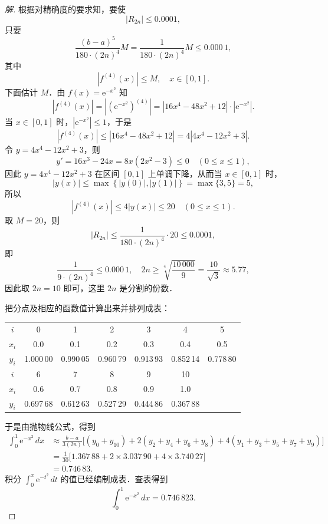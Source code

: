 \begin{proof}[解]
根据对精确度的要求知，要使
\[
|R_{2n}| \leqslant 0.0001,
\]
只要
\[
\frac{(b - a)^5}{180\cdot(2n)^4}M = \frac{1}{180\cdot(2n)^4}M \leqslant 0.000\,1,
\]
其中
\[
|f^{(4)}(x)| \leqslant M, \quad x \in [0,1].
\]
下面估计 $M$．由 $f(x) = \mathrm{e}^{-x^2}$ 知
\[
|f^{(4)}(x)| = \left|\left(\mathrm{e}^{-x^2}\right)^{(4)}\right| = |16x^4 - 48x^2 + 12|\cdot\left|\mathrm{e}^{-x^2}\right|.
\]
当 $x \in [0,1]$ 时，$\left|\mathrm{e}^{-x^2}\right| \leqslant 1$，于是
\[
|f^{(4)}(x)| \leqslant |16x^4 - 48x^2 + 12| = 4|4x^4 - 12x^2 + 3|.
\]
令 $y = 4x^4 - 12x^2 + 3$，则
\[
y' = 16x^3 - 24x = 8x(2x^2 - 3) \leqslant 0 \quad (0 \leqslant x \leqslant 1),
\]
因此 $y = 4x^4 - 12x^2 + 3$ 在区间 $[0,1]$ 上单调下降，从而当 $x \in [0,1]$ 时，
\[
|y(x)| \leqslant \max\left\{|y(0)|, |y(1)|\right\} = \max\{3, 5\} = 5,
\]
所以
\[
|f^{(4)}(x)| \leqslant 4|y(x)| \leqslant 20 \quad (0 \leqslant x \leqslant 1).
\]
取 $M = 20$，则
\[
|R_{2n}| \leqslant \frac{1}{180\cdot(2n)^4}\cdot 20 \leqslant 0.0001,
\]
即
\[
\frac{1}{9\cdot(2n)^4} \leqslant 0.000\,1, \quad 2n \geqslant \sqrt[4]{\frac{10\,000}{9}} = \frac{10}{\sqrt{3}} \approx 5.77,
\]
因此取 $2n = 10$ 即可，这里 $2n$ 是分割的份数．

把分点及相应的函数值计算出来并排列成表：
\begin{center}
\begin{tabular}{c|cccccc}
\hline
$i$ & 0 & 1 & 2 & 3 & 4 & 5 \\
$x_i$ & 0.0 & 0.1 & 0.2 & 0.3 & 0.4 & 0.5 \\
$y_i$ & 1.000\,00 & 0.990\,05 & 0.960\,79 & 0.913\,93 & 0.852\,14 & 0.778\,80 \\
\hline
$i$ & 6 & 7 & 8 & 9 & 10 & \\
$x_i$ & 0.6 & 0.7 & 0.8 & 0.9 & 1.0 & \\
$y_i$ & 0.697\,68 & 0.612\,63 & 0.527\,29 & 0.444\,86 & 0.367\,88 & \\
\hline
\end{tabular}
\end{center}
于是由抛物线公式，得到
\begin{align*}
\int_0^1 \mathrm{e}^{-x^2}\,dx &\approx \frac{b - a}{3(2n)}\Big[(y_0 + y_{10}) + 2(y_2 + y_4 + y_6 + y_8) + 4(y_1 + y_3 + y_5 + y_7 + y_9)\Big] \\
&= \frac{1}{30}\Big[1.367\,88 + 2 \times 3.037\,90 + 4 \times 3.740\,27\Big] \\
&= 0.746\,83.
\end{align*}
积分 $\int_0^x \mathrm{e}^{-t^2}\,dt$ 的值已经编制成表．查表得到
\[
\int_0^1 \mathrm{e}^{-x^2}\,dx = 0.746\,823.
\]
\end{proof}

